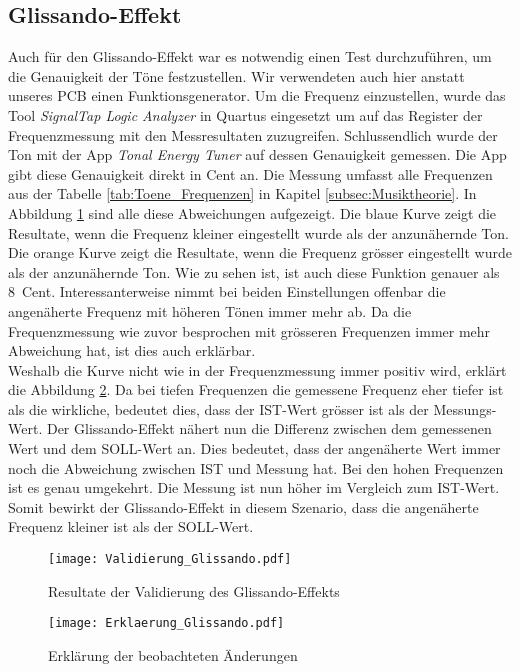\subsection{Glissando-Effekt}\label{subsec:Glissando_Effekt}
Auch für den Glissando-Effekt war es notwendig einen Test durchzuführen, um die Genauigkeit der Töne festzustellen. Wir verwendeten auch hier anstatt unseres PCB einen Funktionsgenerator. Um die Frequenz einzustellen, wurde das Tool \textit{SignalTap Logic Analyzer} in Quartus eingesetzt um auf das Register der Frequenzmessung mit den Messresultaten zuzugreifen. Schlussendlich wurde der Ton mit der App \textit{Tonal Energy Tuner} auf dessen Genauigkeit gemessen. Die App gibt diese Genauigkeit direkt in Cent an. Die Messung umfasst alle Frequenzen aus der Tabelle \ref{tab:Toene_Frequenzen} in Kapitel \ref{subsec:Musiktheorie}. In Abbildung \ref{img:Validierung_Glissando} sind alle diese Abweichungen aufgezeigt. Die blaue Kurve  zeigt die Resultate, wenn die Frequenz kleiner eingestellt wurde als der anzunähernde Ton. Die orange Kurve zeigt die Resultate, wenn die Frequenz grösser eingestellt wurde als der anzunähernde Ton. Wie zu sehen ist, ist auch diese Funktion genauer als \SI{8}{Cent}. Interessanterweise nimmt bei beiden Einstellungen offenbar die angenäherte Frequenz mit höheren Tönen immer mehr ab. Da die Frequenzmessung wie zuvor besprochen mit grösseren Frequenzen immer mehr Abweichung hat, ist dies auch erklärbar.\\
Weshalb die Kurve nicht wie in der Frequenzmessung immer positiv wird, erklärt die Abbildung \ref{img:Erklaerung_Glissando}. Da bei tiefen Frequenzen die gemessene Frequenz eher tiefer ist als die wirkliche, bedeutet dies, dass der IST-Wert grösser ist als der Messungs-Wert. Der Glissando-Effekt nähert nun die Differenz zwischen dem gemessenen Wert und dem SOLL-Wert an. Dies bedeutet, dass der angenäherte Wert immer noch die Abweichung zwischen IST und Messung hat. Bei den hohen Frequenzen ist es genau umgekehrt. Die Messung ist nun höher im Vergleich zum IST-Wert. Somit bewirkt der Glissando-Effekt in diesem Szenario, dass die angenäherte Frequenz kleiner ist als der SOLL-Wert.


\begin{figure}[h!]
	\centering
	\texttt{[image: Validierung\_Glissando.pdf]}
	\caption{Resultate der Validierung des Glissando-Effekts} 
	\label{img:Validierung_Glissando}
\end{figure}  

\begin{figure}[h!]
	\centering
	\texttt{[image: Erklaerung\_Glissando.pdf]}
	\caption{Erklärung der beobachteten Änderungen} 
	\label{img:Erklaerung_Glissando}
\end{figure} 

